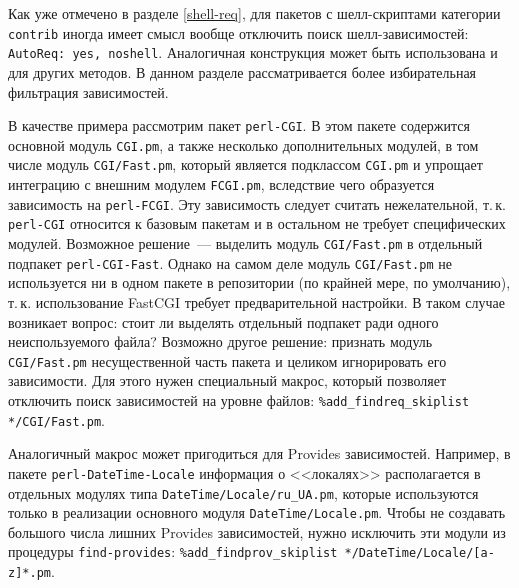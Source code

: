 \documentclass[russian,a4paper,12pt,titlepage]{article}
\begin{document}
Как уже отмечено в разделе \ref{shell-req}, для пакетов с шелл-скриптами категории \verb|contrib|
иногда имеет смысл вообще отключить поиск шелл-зависимостей: \texttt{AutoReq: yes, noshell}.  Аналогичная
конструкция может быть использована и для других методов.  В данном разделе рассматривается более избирательная
фильтрация зависимостей.

В качестве примера рассмотрим пакет \verb|perl-CGI|.  В этом пакете содержится основной модуль \verb|CGI.pm|,
а также несколько дополнительных модулей, в том числе модуль \verb|CGI/Fast.pm|, который является подклассом \verb|CGI.pm|
и упрощает интеграцию с внешним модулем \verb|FCGI.pm|, вследствие чего образуется зависимость на \verb|perl-FCGI|.
Эту зависимость следует считать нежелательной, т.\,к. \verb|perl-CGI| относится к базовым пакетам и в остальном не требует
специфических модулей.  Возможное решение~--- выделить модуль \verb|CGI/Fast.pm| в отдельный подпакет \verb|perl-CGI-Fast|.
Однако на самом деле модуль \verb|CGI/Fast.pm| не используется ни в одном пакете в репозитории (по крайней мере, по умолчанию),
т.\,к. использование FastCGI требует предварительной настройки.  В таком случае возникает вопрос: стоит ли выделять
отдельный подпакет ради одного неиспользуемого файла?  Возможно другое решение: признать модуль \verb|CGI/Fast.pm|
несущественной часть пакета и целиком игнорировать его зависимости.  Для этого нужен специальный макрос, который позволяет
отключить поиск зависимостей на уровне файлов: \verb|%add_findreq_skiplist */CGI/Fast.pm|.

Аналогичный макрос может пригодиться для Provides зависимостей.  Например, в пакете \verb|perl-DateTime-Locale|
информация о <<локалях>> располагается в отдельных модулях типа \verb|DateTime/Locale/ru_UA.pm|, которые используются
только в реализации основного модуля \verb|DateTime/Locale.pm|.  Чтобы не создавать большого числа лишних
Provides зависимостей, нужно исключить эти модули из процедуры \verb|find-provides|:
\verb|%add_findprov_skiplist */DateTime/Locale/[a-z]*.pm|.
\end{document}
